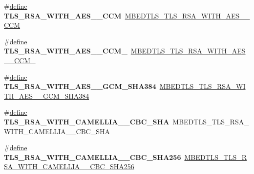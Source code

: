 \begin{DoxyCompactItemize}
\item 
\mbox{\label{compat-1_83_8h_a2df7b23c7917aad60d1654e3826ca388}} 
\#\hyperlink{structdefine}{define} {\bfseries T\+L\+S\+\_\+\+R\+S\+A\+\_\+\+W\+I\+T\+H\+\_\+\+A\+E\+S\+\_\+\_\+\+C\+CM}~\hyperlink{ssl__ciphersuites_8h_a81e67c978273a06bdf315383f5799c14}{M\+B\+E\+D\+T\+L\+S\+\_\+\+T\+L\+S\+\_\+\+R\+S\+A\+\_\+\+W\+I\+T\+H\+\_\+\+A\+E\+S\+\_\+\_\+\+C\+CM}
\item 
\mbox{\label{compat-1_83_8h_a4e834323b40bc42a0b89ce69ca6fc75f}} 
\#\hyperlink{structdefine}{define} {\bfseries T\+L\+S\+\_\+\+R\+S\+A\+\_\+\+W\+I\+T\+H\+\_\+\+A\+E\+S\+\_\+\_\+\+C\+C\+M\+\_}~\hyperlink{ssl__ciphersuites_8h_ab216990126f163693a744f89da89342c}{M\+B\+E\+D\+T\+L\+S\+\_\+\+T\+L\+S\+\_\+\+R\+S\+A\+\_\+\+W\+I\+T\+H\+\_\+\+A\+E\+S\+\_\+\_\+\+C\+C\+M\+\_}
\item 
\mbox{\label{compat-1_83_8h_a275538776fa5a59590823e1c671aed67}} 
\#\hyperlink{structdefine}{define} {\bfseries T\+L\+S\+\_\+\+R\+S\+A\+\_\+\+W\+I\+T\+H\+\_\+\+A\+E\+S\+\_\+\_\+\+G\+C\+M\+\_\+\+S\+H\+A384}~\hyperlink{ssl__ciphersuites_8h_aa36867dde89d76a33c6d44f920900bf8}{M\+B\+E\+D\+T\+L\+S\+\_\+\+T\+L\+S\+\_\+\+R\+S\+A\+\_\+\+W\+I\+T\+H\+\_\+\+A\+E\+S\+\_\+\_\+\+G\+C\+M\+\_\+\+S\+H\+A384}
\item 
\mbox{\label{compat-1_83_8h_a358635ef2fade358c9765c77cfe2adb4}} 
\#\hyperlink{structdefine}{define} {\bfseries T\+L\+S\+\_\+\+R\+S\+A\+\_\+\+W\+I\+T\+H\+\_\+\+C\+A\+M\+E\+L\+L\+I\+A\+\_\+\_\+\+C\+B\+C\+\_\+\+S\+HA}~M\+B\+E\+D\+T\+L\+S\+\_\+\+T\+L\+S\+\_\+\+R\+S\+A\+\_\+\+W\+I\+T\+H\+\_\+\+C\+A\+M\+E\+L\+L\+I\+A\+\_\+\_\+\+C\+B\+C\+\_\+\+S\+HA
\item 
\mbox{\label{compat-1_83_8h_acbaa4521b0d7e9b6f61ad4ba2b718695}} 
\#\hyperlink{structdefine}{define} {\bfseries T\+L\+S\+\_\+\+R\+S\+A\+\_\+\+W\+I\+T\+H\+\_\+\+C\+A\+M\+E\+L\+L\+I\+A\+\_\+\_\+\+C\+B\+C\+\_\+\+S\+H\+A256}~\hyperlink{ssl__ciphersuites_8h_a6ee3cf87a1e96612a864c90588a57892}{M\+B\+E\+D\+T\+L\+S\+\_\+\+T\+L\+S\+\_\+\+R\+S\+A\+\_\+\+W\+I\+T\+H\+\_\+\+C\+A\+M\+E\+L\+L\+I\+A\+\_\+\_\+\+C\+B\+C\+\_\+\+S\+H\+A256}
\item 
\mbox{\label{compat-1_83_8h_a7edd2231e213dbec6e480b6e72dca8fe}} 

\end{DoxyCompactItemize}
